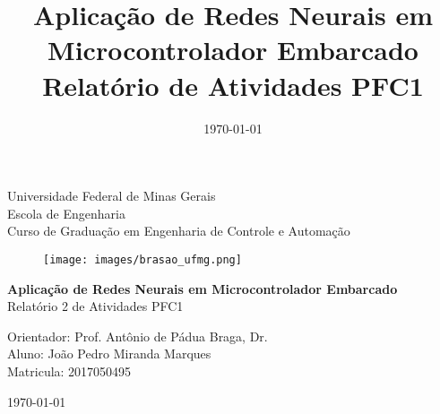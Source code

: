 \begin{titlepage}
    \begin{center}
           
    {\large Universidade Federal de Minas Gerais\\
    Escola de Engenharia \\
    Curso de Graduação em Engenharia de Controle e Automação\\}
    \vfill

    \begin{figure}[h]
        \centering
        \texttt{[image: images/brasao\_ufmg.png]}
    \end{figure}
    \vspace{2cm}


    {\bf\Large Aplicação de Redes Neurais em Microcontrolador Embarcado\\}
    \vspace{1cm} 
    {\Large Relatório 2 de Atividades PFC1}
    \vspace{2cm}  
    
    {\large Orientador: Prof. Antônio de Pádua Braga, Dr.}\\

    
    {\large Aluno: João Pedro Miranda Marques \\
    Matricula: 2017050495}
    \vspace{2cm}  

    \today
    \vspace{2cm}  
       

    \large \date{\today}
    \end{center}
    
    \end{titlepage}
    
    \newpage
    \clearpage
    \thispagestyle{empty}
    
    \cleardoublepage


\title{
    Aplicação de Redes Neurais em Microcontrolador Embarcado \\
    \large Relatório de Atividades PFC1}

